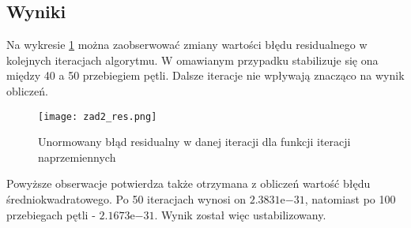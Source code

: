 \vspace{5mm}



\subsection{Wyniki}

Na wykresie \ref{rys:zad2_res} można zaobserwować zmiany wartości błędu residualnego w kolejnych iteracjach algorytmu. W omawianym przypadku stabilizuje się ona między 40 a 50 przebiegiem pętli. Dalsze iteracje nie wpływają znacząco na wynik obliczeń.

\begin{figure}[H]
	\centering
	\hspace*{-1.2in}
	\texttt{[image: zad2\_res.png]}
	\caption{Unormowany błąd residualny w danej iteracji dla funkcji iteracji naprzemiennych}  
	\label{rys:zad2_res} 
\end{figure}

Powyższe obserwacje potwierdza także otrzymana z obliczeń wartość błędu średniokwadratowego. Po 50 iteracjach wynosi on $2.3831\mathrm{e}{-31}$, natomiast po 100 przebiegach pętli - $2.1673\mathrm{e}{-31}$. Wynik został więc ustabilizowany.
